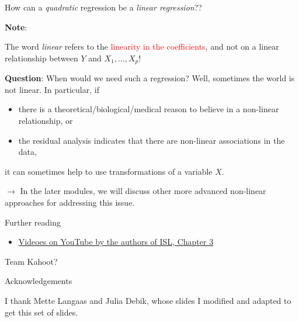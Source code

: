 \documentclass[10pt,ignorenonframetext,]{beamer}
\providecommand{\tightlist}{%
  \setlength{\itemsep}{0pt}\setlength{\parskip}{0pt}}
\begin{document}
\begin{frame}

How can a \emph{quadratic} regression be a \emph{linear regression}??

\vspace{4mm}

\textbf{Note}:

The word \emph{linear} refers to the
\textcolor{red}{linearity in the coefficients}, and not on a linear
relationship between \(Y\) and \(X_1, \ldots , X_p\)!

\vspace{4mm}

\textbf{Question}: When would we need such a regression? Well, sometimes
the world is not linear. In particular, if

\begin{itemize}
\tightlist
\item
  there is a theoretical/biological/medical reason to believe in a
  non-linear relationship, or
\item
  the residual analysis indicates that there are non-linear associations
  in the data,
\end{itemize}

it can sometimes help to use transformations of a variable \(X\).

\vspace{2mm}

\scriptsize
\(\rightarrow\) In the later modules, we will discuss other more
advanced non-linear approaches for addressing this issue.

\end{frame}

\begin{frame}{ Further reading }

\begin{itemize}
\tightlist
\item
  \href{https://www.youtube.com/playlist?list=PL5-da3qGB5IBSSCPANhTgrw82ws7w_or9}{Videoes
  on YouTube by the authors of ISL, Chapter 3}
\end{itemize}

\end{frame}

\begin{frame}

Team Kahoot?

\end{frame}

\begin{frame}{Acknowledgements}

I thank Mette Langaas and Julia Debik, whose slides I modified and
adapted to get this set of slides.

\end{frame}
\end{document}

